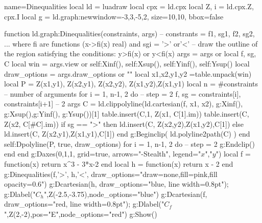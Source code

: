 \documentclass[border=2 mm]{standalone}
\begin{document}
\begin{luadraw}{name=Dinequalities}
local ld = luadraw
local cpx = ld.cpx
local Z, i = ld.cpx.Z, cpx.I
local g = ld.graph:new{window={-3,3,-5,2}, size={10,10}, bbox=false}

function ld.graph:Dinequalities(constraints, args)
    -- constrants = { f1, sg1, f2, sg2, ...} where fi are functions (x->fi(x) real) and sgi = '>' or'<'
    -- draw the outline of the region satisfying the conditions: y>fi(x) or y<fi(x)
    args = args or {}
    local f, sg, C
    local win = args.view or {self:Xinf(), self:Xsup(), self:Yinf(), self:Ysup()}
    local draw_options = args.draw_options or ""
    local x1,x2,y1,y2 =table.unpack(win)
    local P = {Z(x1,y1), Z(x2,y1), Z(x2,y2), Z(x1,y2),Z(x1,y1)}
    local n = #constraints  -- number of arguments
    for i = 1, n-1, 2 do   -- step = 2
        f, sg = constraints[i], constraints[i+1]  -- 2 args
        C = ld.clippolyline(ld.cartesian(f, x1, x2), g:Xinf(), g:Xsup(),g:Yinf(), g:Ysup())[1]
        table.insert(C,1, Z(x1, C[1].im))
        table.insert(C, Z(x2, C[#C].im))
        if sg == ">" then
            ld.insert(C, {Z(x2,y2),Z(x1,y2),C[1]})
        else
            ld.insert(C, {Z(x2,y1),Z(x1,y1),C[1]})
        end
        g:Beginclip( ld.polyline2path(C) )
    end
    self:Dpolyline(P, true, draw_options)
    for i = 1, n-1, 2 do   -- step = 2
        g:Endclip()
    end
end
g:Daxes({0,1,1}, {grid=true, arrows="-Stealth", legend={"$x$","$y$"}})
local f = function(x) return x^3 - 3*x-2 end
local h = function(x) return x - 2 end
g:Dinequalities({f,'>', h,'<'}, {draw_options="draw=none,fill=pink,fill opacity=0.6"})
g:Dcartesian(h, {draw_options="blue, line width=0.8pt"}); g:Dlabel("$C_h$",Z(-2.5,-3.75),{node_options="blue"})
g:Dcartesian(f, {draw_options="red, line width=0.8pt"}); g:Dlabel("$C_f$",Z(2,-2),{pos="E",node_options="red"})
g:Show()
\end{luadraw}
\end{document}
